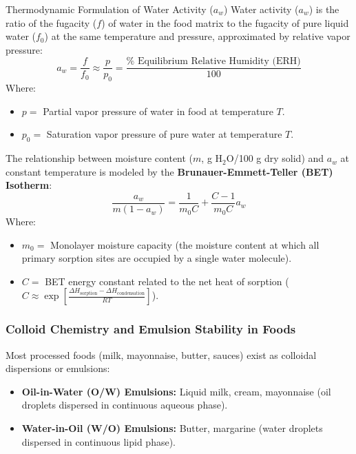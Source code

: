 \documentclass[11pt,a4paper,oneside]{article}
\begin{document}
\begin{formulabox}{Thermodynamic Formulation of Water Activity ($a_w$)}
Water activity ($a_w$) is the ratio of the fugacity ($f$) of water in the food matrix to the fugacity of pure liquid water ($f_0$) at the same temperature and pressure, approximated by relative vapor pressure:
$$a_w = \frac{f}{f_0} \approx \frac{p}{p_0} = \frac{\% \text{ Equilibrium Relative Humidity (ERH)}}{100}$$
Where:
\begin{itemize}
    \item $p =$ Partial vapor pressure of water in food at temperature $T$.
    \item $p_0 =$ Saturation vapor pressure of pure water at temperature $T$.
\end{itemize}
The relationship between moisture content ($m$, g $\mathrm{H_2O}$/100 g dry solid) and $a_w$ at constant temperature is modeled by the \textbf{Brunauer-Emmett-Teller (BET) Isotherm}:
$$\frac{a_w}{m (1 - a_w)} = \frac{1}{m_0 C} + \frac{C - 1}{m_0 C} a_w$$
Where:
\begin{itemize}
    \item $m_0 =$ Monolayer moisture capacity (the moisture content at which all primary sorption sites are occupied by a single water molecule).
    \item $C =$ BET energy constant related to the net heat of sorption ($C \approx \exp\left[\frac{\Delta H_{\text{sorption}} - \Delta H_{\text{condensation}}}{RT}\right]$).
\end{itemize}
\end{formulabox}

\subsubsection{Colloid Chemistry and Emulsion Stability in Foods}
Most processed foods (milk, mayonnaise, butter, sauces) exist as colloidal dispersions or emulsions:
\begin{itemize}[leftmargin=*]
    \item \textbf{Oil-in-Water (O/W) Emulsions:} Liquid milk, cream, mayonnaise (oil droplets dispersed in continuous aqueous phase).
    \item \textbf{Water-in-Oil (W/O) Emulsions:} Butter, margarine (water droplets dispersed in continuous lipid phase).
\end{itemize}
\end{document}
